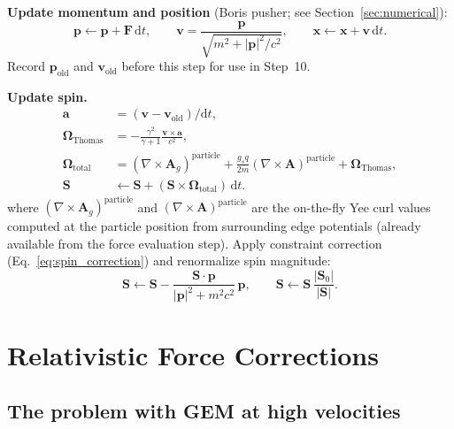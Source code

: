 \documentclass[11pt,a4paper]{article}
\newcommand{\vv}[1]{\mathbf{#1}}
\newcommand{\Ag}{\vv{A}_g}
\newcommand{\dd}{\mathrm{d}}
\begin{document}
\begin{algsteps}
  \item \textbf{Update momentum and position} (Boris pusher; see Section~\ref{sec:numerical}):
  \begin{equation}
    \vv{p} \leftarrow \vv{p} + \vv{F}\,\dd t, \qquad
    \vv{v} = \frac{\vv{p}}{\sqrt{m^2+|\vv{p}|^2/c^2}}, \qquad
    \vv{x} \leftarrow \vv{x} + \vv{v}\,\dd t.
  \end{equation}
  Record $\vv{p}_{\mathrm{old}}$ and $\vv{v}_{\mathrm{old}}$ before this step for use in Step~10.

  \item \textbf{Update spin.}
  \begin{align}
    \vv{a}                      &= (\vv{v} - \vv{v}_{\mathrm{old}})/\dd t, \\
    \boldsymbol{\Omega}_{\mathrm{Thomas}} &= -\frac{\gamma^2}{\gamma+1}\frac{\vv{v}\times\vv{a}}{c^2}, \\
    \boldsymbol{\Omega}_{\mathrm{total}} &= (\nabla\times\Ag)^{\mathrm{particle}} + \frac{g_s q}{2m}(\nabla\times\vv{A})^{\mathrm{particle}} + \boldsymbol{\Omega}_{\mathrm{Thomas}}, \\
    \vv{S}                      &\leftarrow \vv{S} + (\vv{S}\times\boldsymbol{\Omega}_{\mathrm{total}})\,\dd t.
  \end{align}
  where $(\nabla\times\Ag)^{\mathrm{particle}}$ and $(\nabla\times\vv{A})^{\mathrm{particle}}$ are the on-the-fly Yee curl values computed at the particle position from surrounding edge potentials (already available from the force evaluation step).
  Apply constraint correction (Eq.~\ref{eq:spin_correction}) and renormalize spin magnitude:
  \begin{equation}
    \vv{S} \leftarrow \vv{S} - \frac{\vv{S}\cdot\vv{p}}{|\vv{p}|^2 + m^2c^2}\,\vv{p}, \qquad
    \vv{S} \leftarrow \vv{S}\,\frac{|\vv{S}_0|}{|\vv{S}|}.
  \end{equation}
\end{algsteps}

\section{Relativistic Force Corrections}
\label{sec:relcorr}

\subsection{The problem with GEM at high velocities}
\end{document}
